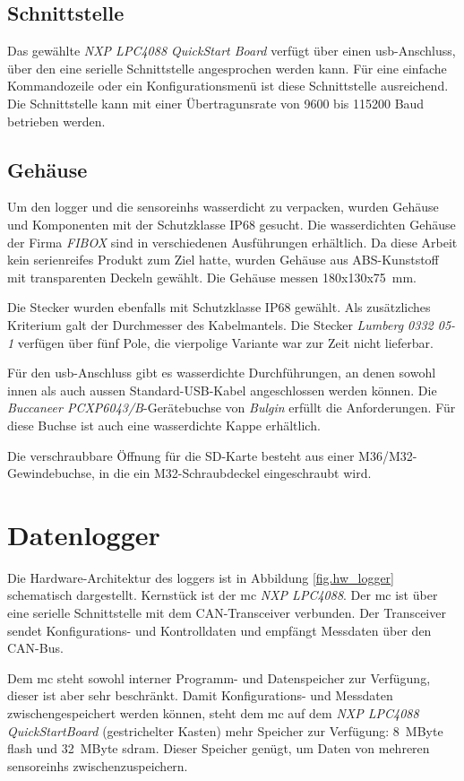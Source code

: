 \subsection{Schnittstelle}
Das gewählte \emph{NXP LPC4088 QuickStart Board} verfügt über einen \gls{usb}-Anschluss, über den eine serielle Schnittstelle angesprochen werden kann. Für eine einfache Kommandozeile oder ein Konfigurationsmenü ist diese Schnittstelle ausreichend. Die Schnittstelle kann mit einer Übertragunsrate von 9600 bis 115200 Baud betrieben werden. 


\subsection{Gehäuse}
Um den \gls{logger} und die \glspl{sensoreinh} wasserdicht zu verpacken, wurden Gehäuse und Komponenten mit der Schutzklasse IP68 gesucht. Die wasserdichten Gehäuse der Firma \emph{FIBOX} sind in verschiedenen Ausführungen erhältlich. Da diese Arbeit kein serienreifes Produkt zum Ziel hatte, wurden Gehäuse aus ABS-Kunststoff mit transparenten Deckeln gewählt. Die Gehäuse messen 180x130x75~mm.

Die Stecker wurden ebenfalls mit Schutzklasse IP68 gewählt. Als zusätzliches Kriterium galt der Durchmesser des Kabelmantels. Die Stecker \emph{Lumberg 0332 05-1} verfügen über fünf Pole, die vierpolige Variante war zur Zeit nicht lieferbar.

Für den \gls{usb}-Anschluss gibt es wasserdichte Durchführungen, an denen sowohl innen als auch aussen Standard-USB-Kabel angeschlossen werden können. Die \emph{Buccaneer PCXP6043/B}-Gerätebuchse von \emph{Bulgin} erfüllt die Anforderungen. Für diese Buchse ist auch eine wasserdichte Kappe erhältlich.

Die verschraubbare Öffnung für die SD-Karte besteht aus einer M36/M32-Gewindebuchse, in die ein M32-Schraubdeckel eingeschraubt wird.


\section{Datenlogger}
Die Hardware-Architektur des \gls{logger}s ist in Abbildung \ref{fig.hw_logger} schematisch dargestellt. Kernstück ist der \gls{mc} \emph{NXP LPC4088}. Der \gls{mc} ist über eine serielle Schnittstelle mit dem CAN-Transceiver verbunden. Der Transceiver sendet Konfigurations- und Kontrolldaten und empfängt Messdaten über den CAN-Bus.

Dem \gls{mc} steht sowohl interner Programm- und Datenspeicher zur Verfügung, dieser ist aber sehr beschränkt. Damit Konfigurations- und Messdaten zwischengespeichert werden können, steht dem \gls{mc} auf dem \emph{NXP LPC4088 QuickStartBoard} (gestrichelter Kasten) mehr Speicher zur Verfügung: 8~MByte \gls{flash} und 32~MByte \gls{sdram}. Dieser Speicher genügt, um Daten von mehreren \glspl{sensoreinh} zwischenzuspeichern.

